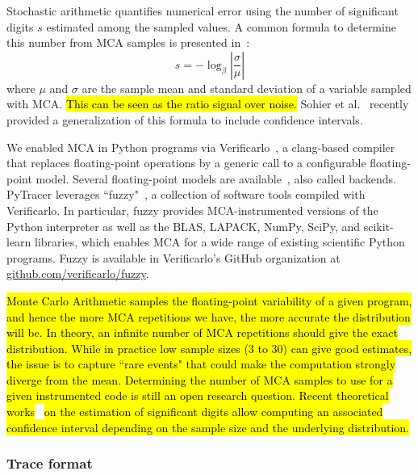 \documentclass[10pt,journal,compsoc]{IEEEtran}
\newcommand{\pytracer}[0]{PyTracer\xspace}
\DeclareRobustCommand{\add}[1]{\sethlcolor{lightgreen}\hl{#1}}
\DeclareRobustCommand{\add}[1]{#1}
\begin{document}
Stochastic arithmetic quantifies numerical error using the number of significant
digits $s$ estimated among the sampled values. A common formula to determine
this number from MCA samples is presented in~\cite{parker1997monte}:
\begin{equation}
    s = -\log_{\beta}{ \left| \dfrac{\sigma}{\mu} \right|} \label{eq:sig-digits}
\end{equation}
where $\mu$ and $\sigma$ are the sample mean and standard deviation of a
variable sampled with MCA. \add{This can be seen as the ratio signal over noise.}
Sohier et al.~\cite{sohier2021confidence} recently provided a generalization of
this formula to include confidence intervals.

We enabled MCA in Python programs via Verificarlo~\cite{verificarlo}, a
clang-based compiler~\cite{lattner2008llvm} that replaces floating-point
operations by a generic call to a configurable floating-point model. Several
floating-point models are
available~\cite{chatelain2019automatic,chatelain2019outils}, also called
backends. \pytracer leverages ``fuzzy"~\cite{kiar2020comparing}, a collection of
software tools compiled with Verificarlo. In particular, fuzzy provides
MCA-instrumented versions of the Python interpreter as well as the BLAS, LAPACK,
NumPy, SciPy, and scikit-learn libraries, which enables MCA for a wide range of
existing scientific Python programs. Fuzzy is available in Verificarlo's GitHub
organization at
\href{https://github.com/verificarlo/fuzzy}{\url{github.com/verificarlo/fuzzy}}.


\add{Monte Carlo Arithmetic samples the floating-point variability of a given
    program, and hence the more MCA repetitions we have, the more accurate the
    distribution will be. In theory, an infinite number of MCA repetitions
    should give the exact distribution. While in practice low sample sizes (3 to 30)
    can give good estimates, the issue is to capture ``rare events" that could make the
    computation strongly diverge from the mean. Determining the number of
    MCA samples to use for a given instrumented code is still an open research question. 
    Recent theoretical works}~\cite{sohier2021confidence}
\add{on the estimation of significant digits allow computing an associated
    confidence interval depending on the sample size and the underlying distribution.}

\subsubsection{Trace format}
\end{document}
